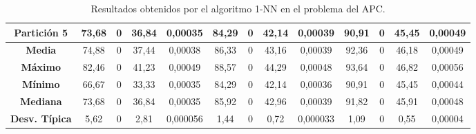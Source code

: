 \documentclass[11pt,a4paper]{article}
\begin{document}
\begin{table}[H]
{\begin{tabular}{c|c|c|c|c|c|c|c|c|c|c|c|c|}
\multicolumn{1}{|c|}{\textbf{Partición 5}}  & 73,68                      & 0                       & 36,84                  & 0,00035    & 84,29                      & 0                       & 42,14                  & 0,00039    & 90,91                      & 0                       & 45,45                  & 0,00049    \\ \hline
\multicolumn{1}{|c|}{\textbf{Media}}        & 74,88                      & 0                       & 37,44                  & 0,00038    & 86,33                      & 0                       & 43,16                  & 0,00039    & 92,36                      & 0                       & 46,18                  & 0,00049    \\ \hline
\multicolumn{1}{|c|}{\textbf{Máximo}}       & 82,46                      & 0                       & 41,23                  & 0,00049    & 88,57                      & 0                       & 44,29                  & 0,00048    & 93,64                      & 0                       & 46,82                  & 0,00056    \\ \hline
\multicolumn{1}{|c|}{\textbf{Mínimo}}       & 66,67                      & 0                       & 33,33                  & 0,00035    & 84,29                      & 0                       & 42,14                  & 0,00036    & 90,91                      & 0                       & 45,45                  & 0,00044    \\ \hline
\multicolumn{1}{|c|}{\textbf{Mediana}}      & 73,68                      & 0                       & 36,84                  & 0,00035    & 85,92                      & 0                       & 42,96                  & 0,00039    & 91,82                      & 0                       & 45,91                  & 0,00048    \\ \hline
\multicolumn{1}{|c|}{\textbf{Desv. Típica}} & 5,62                       & 0                       & 2,81                   & 0,000056   & 1,44                       & 0                       & 0,72                   & 0,000033   & 1,09                       & 0                       & 0,55                   & 0,00004    \\ \hline
\end{tabular}
}%
\caption{Resultados obtenidos por el algoritmo 1-NN en el problema del APC.}
\end{table}
\end{document}
